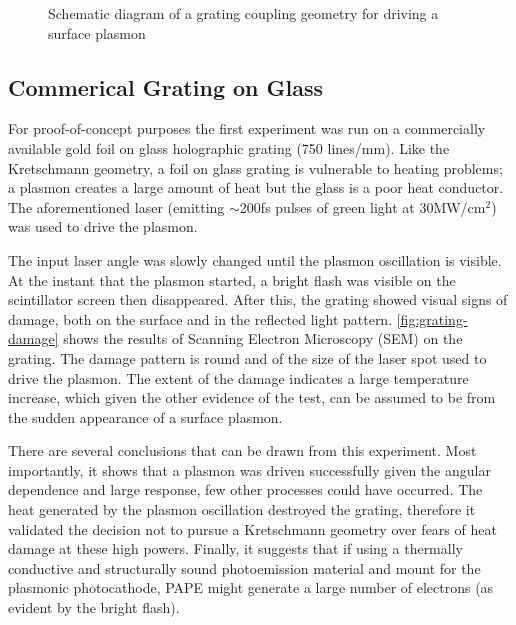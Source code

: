 \begin{figure}
  \centering
  
  \caption[Grating coupling geometry for driving a surface plasmon]{Schematic diagram of a grating coupling geometry for driving a surface plasmon}
  \label{fig:plasmon_schematic}
\end{figure}

\subsection{Commerical Grating on Glass}

For proof-of-concept purposes the first experiment was run on a commercially available gold foil on glass holographic grating (750 lines/mm).
Like the Kretschmann geometry, a foil on glass grating is vulnerable to heating problems; a plasmon creates a large amount of heat but the glass is a poor heat conductor.
The aforementioned laser (emitting $\sim$200fs pulses of green light at 30MW/cm$^2$) was used to drive the plasmon.

The input laser angle was slowly changed until the plasmon oscillation is visible.
At the instant that the plasmon started, a bright flash was visible on the scintillator screen then disappeared.
After this, the grating showed visual signs of damage, both on the surface and in the reflected light pattern.
\ref{fig:grating-damage} shows the results of Scanning Electron Microscopy (SEM) on the grating.
The damage pattern is round and of the size of the laser spot used to drive the plasmon.
The extent of the damage indicates a large temperature increase, which given the other evidence of the test, can be assumed to be from the sudden appearance of a surface plasmon.

There are several conclusions that can be drawn from this experiment.
Most importantly, it shows that a plasmon was driven successfully given the angular dependence and large response, few other processes could have occurred.
The heat generated by the plasmon oscillation destroyed the grating, therefore it validated the decision not to pursue a Kretschmann geometry over fears of heat damage at these high powers.
Finally, it suggests that if using a thermally conductive and structurally sound photoemission material and mount for the plasmonic photocathode, PAPE might generate a large number of electrons (as evident by the bright flash).

